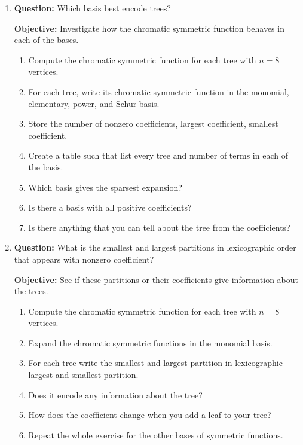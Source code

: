 \documentclass{article}
\begin{document}
\begin{enumerate}
\item[A.]
{\bf Question:} Which basis best encode trees? 

{\bf Objective:} Investigate how the chromatic symmetric function behaves in each of the bases. 
\begin{enumerate}
\item Compute the chromatic symmetric function for each tree with $n=8$ vertices. 
\item For each tree, write its chromatic symmetric function in the monomial, elementary, power, and Schur basis. 
\item Store the number of nonzero coefficients, largest coefficient, smallest coefficient. 
\item Create a table such that list every tree and number of terms in each of the basis.
\item Which basis gives the sparsest expansion? 
\item Is there a basis with all positive coefficients? 
\item Is there anything that you can tell about the tree from the coefficients? 
\end{enumerate}
\item[B.] {\bf Question: } What is the smallest and largest partitions in lexicographic order that appears with nonzero coefficient? 

{\bf Objective: } See if these partitions or their coefficients give information about the trees. 
\begin{enumerate}
\item Compute the chromatic symmetric function for each tree with $n=8$ vertices. 
\item Expand the chromatic symmetric functions in the monomial basis. 
\item For each tree write the smallest and largest partition in lexicographic largest and smallest partition. 
\item Does it encode any information about the tree? 
\item How does the coefficient change when you add a leaf to your tree? 
\item Repeat the whole exercise for the other bases of symmetric functions. 
\end{enumerate}
\end{enumerate}
\newpage
\end{document}
